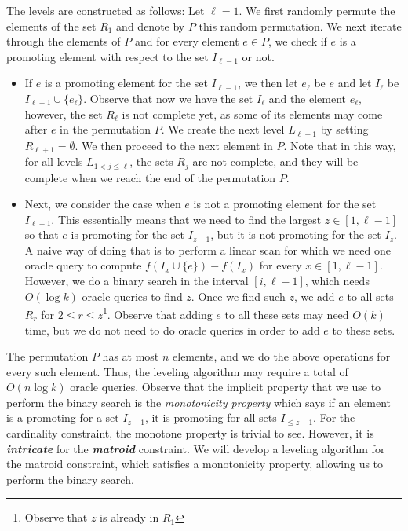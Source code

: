 \documentclass[11pt]{article}
\begin{document}
The levels are constructed as follows:  
Let $\ell =  1$. 
We first randomly permute the elements of the set $R_1$ and denote by $P$ this random permutation. 
We next iterate through the elements of $P$ and for every element $e \in P$, 
we check if $e$ is a promoting element with respect to the set $I_{\ell - 1}$ or not. 

\begin{itemize}
    \item If $e$ is a promoting  element for the set $I_{\ell - 1}$, 
we then let $e_{\ell}$ be $e$ and let $I_{\ell}$ be $I_{\ell - 1} \cup \{e_{\ell}\}$. 
Observe that now we have the set $I_{\ell}$ and the element $e_{\ell}$, 
however, the set $R_{\ell}$ is not complete yet, 
as some of its elements may come after $e$ in the permutation $P$. 
We create the next level $L_{\ell+1}$ by setting $R_{\ell+1} = \emptyset$. 
We then proceed to the next element in $P$. 
Note that in this way, for all levels $L_{1 < j \le \ell}$, the sets $R_j$ are 
not complete, and they will be complete when we reach the end of the permutation $P$. 



\item Next, we consider the case when $e$ is not a promoting element for the set $I_{\ell-1}$. 
    This essentially means that we need to find  
    the largest $z \in [1,\ell-1]$ so that $e$ is promoting  for the set $I_{z-1}$, 
    but it is not promoting for the set $I_{z}$. 
    A naive way of doing that is to perform a linear scan 
    for which we need one oracle query to compute $f(I_{x} \cup \{e\}) - f(I_{x}) $ for every $x \in [1,\ell-1]$. 
    However, we do a binary search in the interval $[i, \ell-1]$, which needs $O(\log k)$ oracle queries to find $z$.     
    Once we find such  $z$, we add $e$ to all sets $R_{r}$ for $2 \le r \le z$\footnote{Observe that $z$ is already in $R_1$}. 
    Observe that adding $e$ to all these sets 
    may need $O(k)$ time, but we do not need to do oracle queries in order to add 
    $e$ to these sets.
\end{itemize}    


The permutation $P$ has at most $n$ elements, and we do the above operations for every such element.
Thus, the leveling algorithm may require a total of $O(n \log k)$ oracle queries.
Observe that the implicit property that we use to perform the binary search 
is the \emph{monotonicity property} which says if an element is a promoting for a set $I_{z-1}$, 
it is promoting for all sets $I_{\le z-1}$. For the cardinality constraint, the monotone property is trivial to see. 
However, it is \textit{\textbf{intricate}}  for the \textit{\textbf{matroid}}  constraint. 
We will develop a leveling algorithm for the matroid constraint, which satisfies a monotonicity property, allowing us to perform the binary search.
\end{document}
